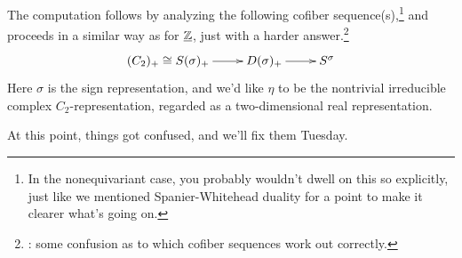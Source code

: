 The computation follows by analyzing the following cofiber sequence(s),\footnote{In the nonequivariant case, you
probably wouldn't dwell on this so explicitly, just like we mentioned Spanier-Whitehead duality for a point to make
it clearer what's going on.} and proceeds in a similar way as for $\underline{\mathbb Z}$, just with a harder
answer.\footnote{\TODO: some confusion as to which cofiber sequences work out correctly.}
\begin{gather}
\label{sigmacofib}
\xymatrix{
	(C_2)_+\cong S(\sigma)_+\ar[r] & D(\sigma)_+\ar[r] & S^\sigma
}
\end{gather}
Here $\sigma$ is the sign representation, and we'd like $\eta$ to be the nontrivial irreducible complex
$C_2$-representation, regarded as a two-dimensional real representation.

At this point, things got confused, and we'll fix them Tuesday.
